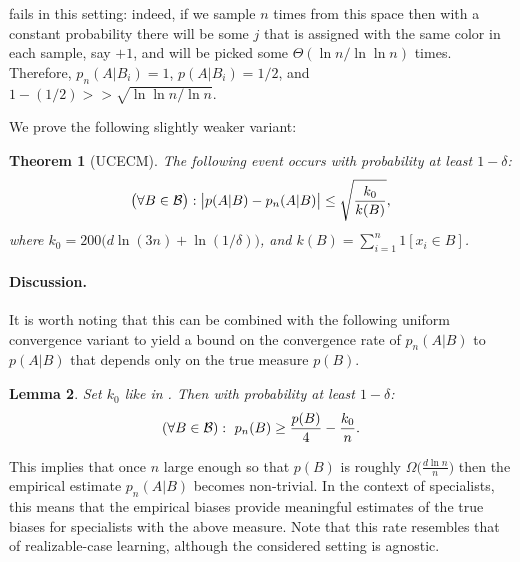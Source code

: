 \documentclass{article}
\newtheorem{theorem}{Theorem}[section]
\newtheorem{lemma}[theorem]{Lemma}
\newcommand{\B}{{\cal B}}
\newcommand{\comment}[3]{\marginpar{\textcolor{#2}{#1: #3}}}
\newcommand{\shay}[1]{\comment{Shay}{red}{#1}}
\begin{document}
 fails in this setting:
indeed, if we sample $n$ times from this space 
then with a constant probability there will be some  $j$
that is assigned with the same color in each sample,  say $+1$, 
and will be picked some $\Theta(\ln n/\ln\ln n)$ times.
Therefore, $p_n(A\vert B_i) = 1$, $p(A\vert B_i)=1/2$,
and $1-(1/2)>> \sqrt{\ln\ln n/\ln n}$.

We prove the following slightly weaker variant:
\begin{theorem}[UCECM]\label{thm:UCECM}
The following event occurs with probability at least $1-\delta$:
\[\bigl(\forall B\in\B\bigr):\bigl\lvert p(A \vert B) - p_n(A \vert B) \bigr\rvert \leq 
\sqrt{\frac{k_0}{k(B)}},\]
where $k_0 =200\bigl(d\ln(3n) + \ln(1/\delta)\bigr)$, and $k(B) = \sum_{i=1}^n 1[x_i\in B]$.
\end{theorem}

\paragraph{Discussion.}

It is worth noting that this can be combined with the following uniform convergence 
variant to yield a bound on the convergence rate of $p_n(A \vert B)$ to $p(A \vert B)$
that depends only on the true measure $p(B)$.
\begin{lemma}\label{lem:uconeside}
Set $k_0$ like in . Then with probability at least $1-\delta$:
\[
(\forall B\in \B):~ p_n(B) \geq \frac{p(B)}{4} - \frac{k_0}{n}.
\]
\end{lemma}
This implies that once $n$ large enough so that $p(B)$ is roughly $\Omega\bigl(\frac{d\ln n}{n}\bigr)$
then the empirical estimate $p_n(A\vert B)$ becomes non-trivial.
In the context of specialists, this means that the empirical
biases provide meaningful estimates of the true biases 
for specialists with the above measure.
Note that this rate resembles that of realizable-case learning,
although the considered setting is agnostic.
%
\end{document}
